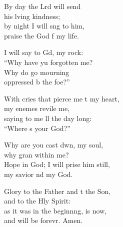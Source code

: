 \begin{psalmverse}
\begin{patverse}
By day the Lrd will send\Med\\
his lving kindness;\\
by night I will s\pointup{\i}ng to him,\Med\\
praise the God f my life.

I will say to Gd, my rock:\Med\\
“Why have yu forgotten me?\\
Why do  go mourning\Med\\
oppressed b the foe?”

With cries that pierce me t my heart,\Med\\
my enem\pointup{\i}es revile me,\\
saying to me ll the day long:\Med\\
“Where \pointup{\i}s your God?”

Why are you cast dwn, my soul,\Med\\
why gran within me?\\
Hope in God; I will prise him still,\Med\\
my savior nd my God.

Glory to the Father and t the Son,\Med\\
and to the Hly Spirit:\\
as it was in the beginn\pointup{\i}ng, is now,\Med\\
and will be forevr. Amen. 
  \end{patverse}
\end{psalmverse}
